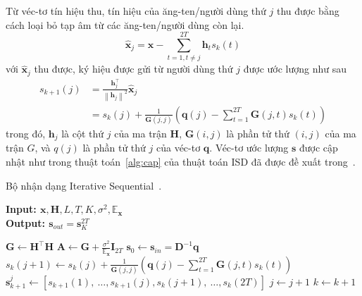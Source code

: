 Từ véc-tơ tín hiệu thu, tín hiệu của ăng-ten/người dùng thứ $j$ thu được bằng cách loại bỏ tạp âm từ các ăng-ten/người dùng còn lại.
\begin{equation}
    \hat{\mathbf{x}}_j=\mathbf{x}-\sum_{t=1, t \neq j}^{2T} \mathbf{h}_t s_k(t)
\end{equation}
với $\hat{\mathbf{x}}_j$ thu được, ký hiệu được gửi từ người dùng thứ $j$ được ước lượng như sau
\begin{equation}
    \begin{aligned}
        s_{k+1}(j) & =\frac{\mathbf{h}_j^\top}{\left\|\mathbf{h}_j\right\|^2} \hat{\mathbf{x}}_j \\ 
        & = s_k(j)+\frac{1}{\mathbf{G}(j, j)}\left(\mathbf{q}(j)-\sum_{t=1}^{2T} \mathbf{G}(j, t) s_k(t)\right)
    \end{aligned}
\end{equation}
trong đó, $\mathbf{h}_j$ là cột thứ $j$ của ma trận $\mathbf{H}$, $\mathbf{G}(i, j)$ là phần tử thứ $(i, j)$ của ma trận $G$, và $q(j)$ là phần tử thứ $j$ của véc-tơ $\mathbf{q}$. Véc-tơ ước lượng $\mathbf{s}$ được cập nhật như trong thuật toán~\ref{alg:cap} của thuật toán ISD đã được đề xuất trong~\cite{Mandloi2017}. 
\begin{algorithm}[ht]
    \caption{Bộ nhận dạng Iterative Sequential~\cite{Mandloi2017}.}\label{alg:cap}
    \hspace*{\algorithmicindent} \textbf{Input: $\mathbf{x}, \mathbf{H}, L, T, K, \sigma^2, \mathbb{E}_\mathbf{x}$} \\
    \hspace*{\algorithmicindent} \textbf{Output: $\mathbf{s}_{out} = \mathbf{s}^{2T}_K$} 
    \begin{algorithmic}[1]
        \State $\mathbf{G} \leftarrow \mathbf{H}^\top \mathbf{H}$
        \State $\mathbf{A} \leftarrow \mathbf{G} + \frac{\sigma^2}{\mathbb{E}_\mathbf{x}} \mathbf{I}_{2T}$
        \State $\mathbf{s}_0 \leftarrow \mathbf{s}_{in} = \mathbf{D}^{-1} \mathbf{q}$ \\
                \State $s_k(j+1) \leftarrow s_k(j)+\frac{1}{\mathbf{G}(j, j)}\left(\mathbf{q}(j)-\sum_{t=1}^{2T} \mathbf{G}(j, t) s_k(t)\right)$ \\ 
                \State $\mathbf{s}_{k+1}^j \leftarrow\left[s_{k+1}(1),~\ldots, s_{k+1}(j), s_k(j+1),~\ldots, s_k(2T)\right]$
                \State $j \leftarrow j + 1$
            \EndFor
            \State $k \leftarrow k + 1$
        \EndFor
    \end{algorithmic}
\end{algorithm}

